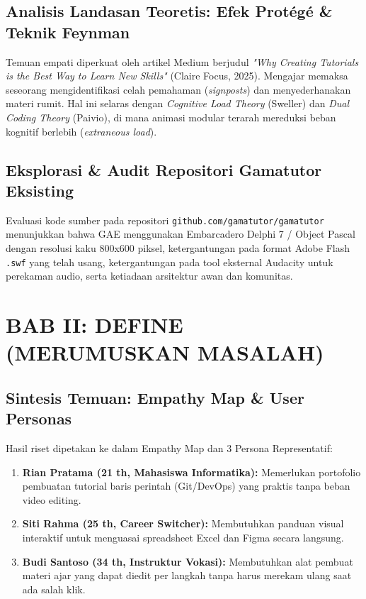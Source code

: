 \documentclass[11pt,a4paper]{article}
\begin{document}
\subsection{Analisis Landasan Teoretis: Efek Prot\'eg\'e \& Teknik Feynman}
Temuan empati diperkuat oleh artikel Medium berjudul \textit{"Why Creating Tutorials is the Best Way to Learn New Skills"} (Claire Focus, 2025). Mengajar memaksa seseorang mengidentifikasi celah pemahaman (\textit{signposts}) dan menyederhanakan materi rumit. Hal ini selaras dengan \textit{Cognitive Load Theory} (Sweller) dan \textit{Dual Coding Theory} (Paivio), di mana animasi modular terarah mereduksi beban kognitif berlebih (\textit{extraneous load}).

\subsection{Eksplorasi \& Audit Repositori Gamatutor Eksisting}
Evaluasi kode sumber pada repositori \texttt{github.com/gamatutor/gamatutor} menunjukkan bahwa GAE menggunakan Embarcadero Delphi 7 / Object Pascal dengan resolusi kaku 800x600 piksel, ketergantungan pada format Adobe Flash \texttt{.swf} yang telah usang, ketergantungan pada tool eksternal Audacity untuk perekaman audio, serta ketiadaan arsitektur awan dan komunitas.

\section{BAB II: DEFINE (MERUMUSKAN MASALAH)}
\subsection{Sintesis Temuan: Empathy Map \& User Personas}
Hasil riset dipetakan ke dalam Empathy Map dan 3 Persona Representatif:
\begin{enumerate}
  \item \textbf{Rian Pratama (21 th, Mahasiswa Informatika):} Memerlukan portofolio pembuatan tutorial baris perintah (Git/DevOps) yang praktis tanpa beban video editing.
  \item \textbf{Siti Rahma (25 th, Career Switcher):} Membutuhkan panduan visual interaktif untuk menguasai spreadsheet Excel dan Figma secara langsung.
  \item \textbf{Budi Santoso (34 th, Instruktur Vokasi):} Membutuhkan alat pembuat materi ajar yang dapat diedit per langkah tanpa harus merekam ulang saat ada salah klik.
\end{enumerate}
\end{document}
